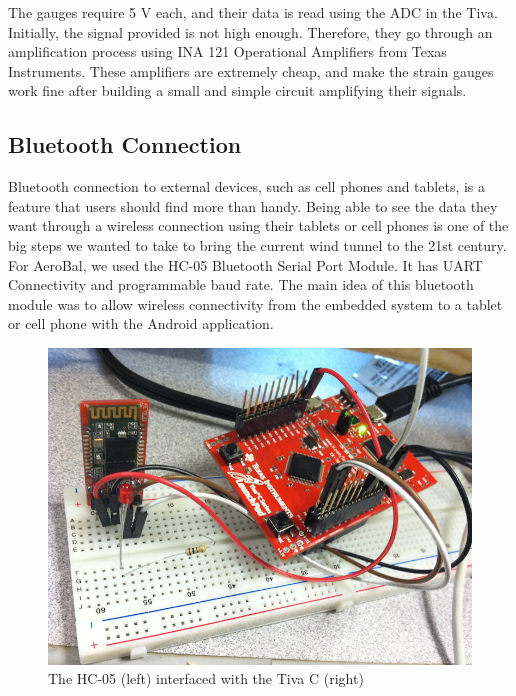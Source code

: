 		The gauges require 5 V each, and their data is read using the ADC in the Tiva. Initially, the signal provided is not high enough. Therefore, they go through an amplification process using INA 121 Operational Amplifiers from Texas Instruments. These amplifiers are extremely cheap, and make the strain gauges work fine after building a small and simple circuit amplifying their signals.
		
		\subsection{Bluetooth Connection}
		
		Bluetooth connection to external devices, such as cell phones and tablets, is a feature that users should find more than handy. Being able to see the data they want through a wireless connection using their tablets or cell phones is one of the big steps we wanted to take to bring the current wind tunnel to the 21st century.  \\
		
		For AeroBal, we used the HC-05 Bluetooth Serial Port Module. It has UART Connectivity and programmable baud rate. The main idea of this bluetooth module was to allow wireless connectivity from the embedded system to a tablet or cell phone with the Android application. 
		
		\begin{figure}[H]
			\centering
				\includegraphics[scale=0.1]{img/bluetoothModule}
			\caption{The HC-05 (left) interfaced with the Tiva C (right)}
		\end{figure}
		
